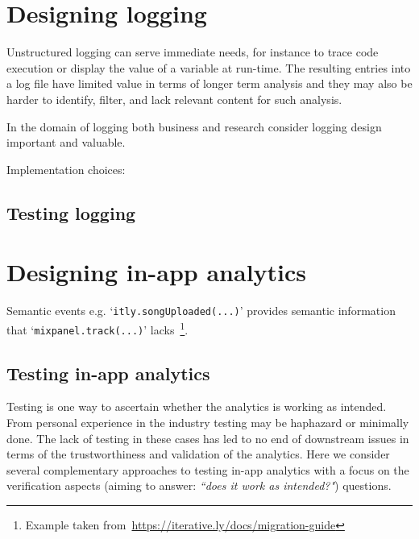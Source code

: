 \section{Designing logging}
Unstructured logging can serve immediate needs, for instance to trace code execution or display the value of a variable at run-time. The resulting entries into a log file have limited value in terms of longer term analysis and they may also be harder to identify, filter, and lack relevant content for such analysis.

In the domain of logging both business and research consider logging design important and valuable. 

Implementation choices: 

\subsection{Testing logging}



\section{Designing in-app analytics}

Semantic events e.g. `\texttt{itly.songUploaded(...)}' provides semantic information that `\texttt{mixpanel.track(...)}' lacks~\footnote{Example taken from~\url{https://iterative.ly/docs/migration-guide}}.

\subsection{Testing in-app analytics}
Testing is one way to ascertain whether the analytics is working as intended. From personal experience in the industry testing may be haphazard or minimally done. The lack of testing in these cases has led to no end of downstream issues in terms of the trustworthiness and validation of the analytics. Here we consider several complementary approaches to testing in-app analytics with a focus on the verification aspects (aiming to answer: \emph{``does it work as intended?"}) questions.

